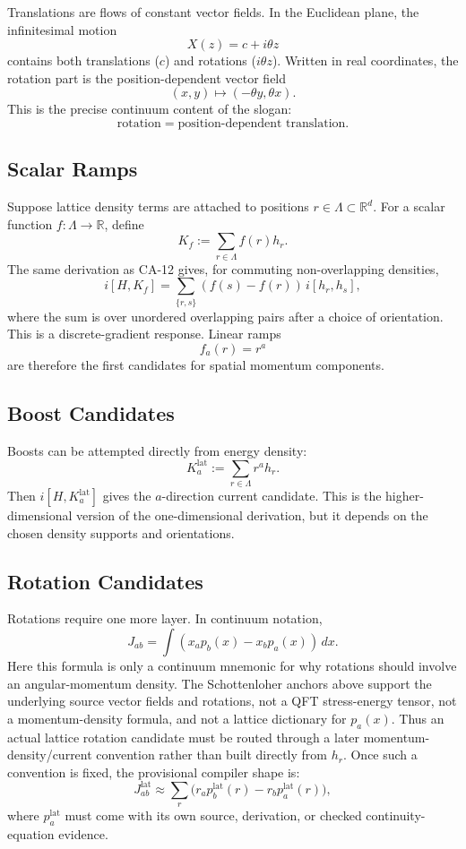 Translations are flows of constant vector fields.  In the Euclidean plane, the
infinitesimal motion
\[
  X(z)=c+i\theta z
\]
contains both translations (\(c\)) and rotations (\(i\theta z\)).  Written in
real coordinates, the rotation part is the position-dependent vector field
\[
  (x,y)\mapsto (-\theta y,\theta x).
\]
This is the precise continuum content of the slogan:
\[
  \text{rotation}=\text{position-dependent translation}.
\]

\subsection{Scalar Ramps}

Suppose lattice density terms are attached to positions \(r\in\Lambda\subset
\mathbb R^d\).  For a scalar function \(f:\Lambda\to\mathbb R\), define
\[
  K_f:=\sum_{r\in\Lambda} f(r)h_r.
\]
The same derivation as CA-12 gives, for commuting non-overlapping densities,
\[
  i[H,K_f]
  =
  \sum_{\{r,s\}}(f(s)-f(r))\,i[h_r,h_s],
\]
where the sum is over unordered overlapping pairs after a choice of orientation.
This is a discrete-gradient response.  Linear ramps
\[
  f_a(r)=r^a
\]
are therefore the first candidates for spatial momentum components.

\subsection{Boost Candidates}

Boosts can be attempted directly from energy density:
\[
  K_a^{\mathrm{lat}}:=\sum_{r\in\Lambda} r^a h_r.
\]
Then \(i[H,K_a^{\mathrm{lat}}]\) gives the \(a\)-direction current candidate.
This is the higher-dimensional version of the one-dimensional derivation, but
it depends on the chosen density supports and orientations.

\subsection{Rotation Candidates}

Rotations require one more layer.  In continuum notation,
\[
  J_{ab}=\int (x_a p_b(x)-x_b p_a(x))\,dx.
\]
Here this formula is only a continuum mnemonic for why rotations should involve
an angular-momentum density.  The Schottenloher anchors above support the
underlying source vector fields and rotations, not a QFT stress-energy tensor,
not a momentum-density formula, and not a lattice dictionary for \(p_a(x)\).
Thus an actual lattice rotation candidate must be routed through a later
momentum-density/current convention rather than built directly from \(h_r\).
Once such a convention is fixed, the provisional compiler shape is:
\[
  J_{ab}^{\mathrm{lat}}
  \approx
  \sum_r \bigl(r_a p_b^{\mathrm{lat}}(r)-r_b p_a^{\mathrm{lat}}(r)\bigr),
\]
where \(p_a^{\mathrm{lat}}\) must come with its own source, derivation, or checked
continuity-equation evidence.

